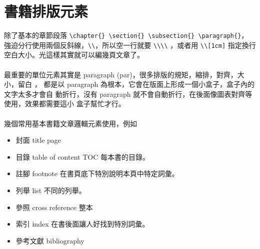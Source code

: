 \section{書籍排版元素}
除了基本的章節段落 \verb=\chapter{} \section{} \subsection{} \paragraph{}=，
強迫分行使用兩個反斜線，\verb=\\=，所以空一行就要 \verb=\\\\= ，或者用
\verb=\\[1cm]= 指定換行空白大小。光這樣其實就可以編幾頁文章了。
\\\\
最重要的單位元素其實是 paragraph (par)，很多排版的規矩，縮排，對齊，大小，留白
， 都是以 paragraph 為根本，它會在版面上形成一個小盒子，盒子內的文字太多才會自
動折行，沒有 paragraph 就不會自動折行，在後面像圖表對齊等使用，效果都需要這小
盒子幫忙才行。 
\\\\
幾個常用基本書籍文章邏輯元素使用，例如
\begin{itemize}
  \item 封面 title page
  \item 目錄 table of content TOC 每本書的目錄。
  \item 註腳 footnote 在書頁底下特別說明本頁中特定詞彙。
  \item 列舉 list 不同的列舉。
  \item 參照 cross reference 整本
  \item 索引 index 在書後面讓人好找到特別詞彙。
  \item 參考文獻 bibliography
\end{itemize}

